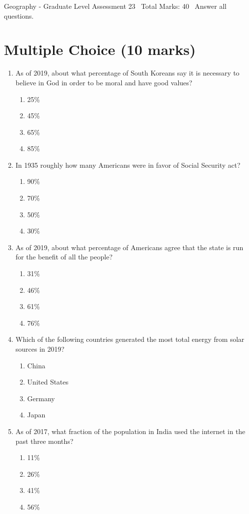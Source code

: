 \documentclass[12pt]{article}
\begin{document}
\begin{center}
Geography - Graduate Level Assessment 23 \
Total Marks: 40 \
Answer all questions.
\end{center}

\section*{Multiple Choice (10 marks)}
\begin{enumerate}[label=\arabic*.]
\item As of 2019, about what percentage of South Koreans say it is necessary to believe in God in order to be moral and have good values?
\begin{enumerate}[label=(\alph*)]
    \item 25\%
    \item 45\%
    \item 65\%
    \item 85\%
\end{enumerate}
\item In 1935 roughly how many Americans were in favor of Social Security act?
\begin{enumerate}[label=(\alph*)]
    \item 90\%
    \item 70\%
    \item 50\%
    \item 30\%
\end{enumerate}
\item As of 2019, about what percentage of Americans agree that the state is run for the benefit of all the people?
\begin{enumerate}[label=(\alph*)]
    \item 31\%
    \item 46\%
    \item 61\%
    \item 76\%
\end{enumerate}
\item Which of the following countries generated the most total energy from solar sources in 2019?
\begin{enumerate}[label=(\alph*)]
    \item China
    \item United States
    \item Germany
    \item Japan
\end{enumerate}
\item As of 2017, what fraction of the population in India used the internet in the past three months?
\begin{enumerate}[label=(\alph*)]
    \item 11\%
    \item 26\%
    \item 41\%
    \item 56\%
\end{enumerate}
\end{enumerate}
\end{document}
